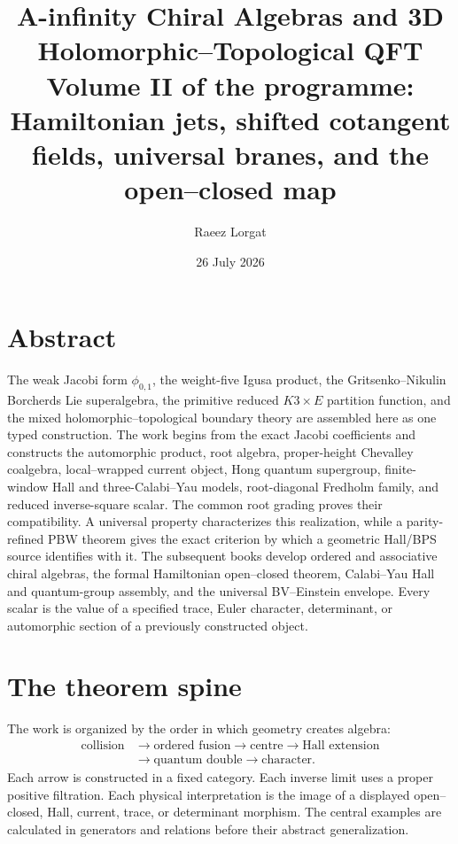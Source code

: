 \documentclass[11pt,twoside,openright]{memoir}
\title{\textbf{A-infinity Chiral Algebras and 3D Holomorphic--Topological QFT}\\[0.55em]\Large Volume II of the programme: Hamiltonian jets, shifted cotangent fields, universal branes, and the open--closed map}
\author{Raeez Lorgat}
\date{26 July 2026}
\begin{document}
\frontmatter
\maketitle
\thispagestyle{empty}
\cleardoublepage
\chapter*{Abstract}

The weak Jacobi form $\phi_{0,1}$, the weight-five Igusa product, the Gritsenko--Nikulin Borcherds Lie superalgebra, the primitive reduced $K3\times E$ partition function, and the mixed holomorphic--topological boundary theory are assembled here as one typed construction.  The work begins from the exact Jacobi coefficients and constructs the automorphic product, root algebra, proper-height Chevalley coalgebra, local--wrapped current object, Hong quantum supergroup, finite-window Hall and three-Calabi--Yau models, root-diagonal Fredholm family, and reduced inverse-square scalar.  The common root grading proves their compatibility.  A universal property characterizes this realization, while a parity-refined PBW theorem gives the exact criterion by which a geometric Hall/BPS source identifies with it.  The subsequent books develop ordered and associative chiral algebras, the formal Hamiltonian open--closed theorem, Calabi--Yau Hall and quantum-group assembly, and the universal BV--Einstein envelope.  Every scalar is the value of a specified trace, Euler character, determinant, or automorphic section of a previously constructed object.


\chapter*{The theorem spine}
The work is organized by the order in which geometry creates algebra:
\[
\begin{aligned}
\text{collision}&\longrightarrow\text{ordered fusion}\longrightarrow\text{centre}\longrightarrow\text{Hall extension}\\
&\longrightarrow\text{quantum double}\longrightarrow\text{character}.
\end{aligned}
\]
Each arrow is constructed in a fixed category.  Each inverse limit uses a proper positive filtration.  Each physical interpretation is the image of a displayed open--closed, Hall, current, trace, or determinant morphism.  The central examples are calculated in generators and relations before their abstract generalization.
\end{document}
